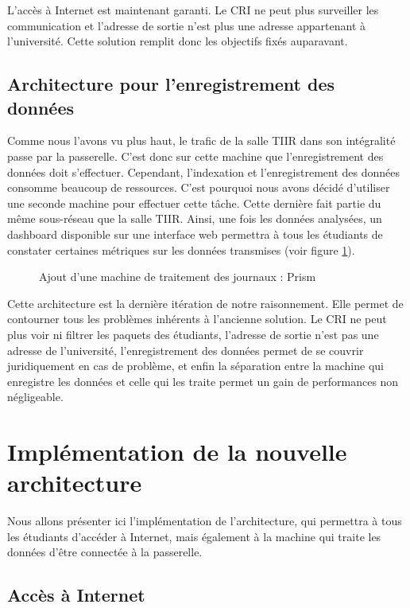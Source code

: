 L'accès à Internet est maintenant garanti. Le CRI ne peut plus surveiller les communication et l'adresse de sortie n'est plus une adresse appartenant à l'université. Cette solution remplit donc les objectifs fixés auparavant.


\subsection{Architecture pour l'enregistrement des données}

Comme nous l'avons vu plus haut, le trafic de la salle TIIR dans son intégralité passe par la passerelle. C'est donc sur cette machine que l'enregistrement des données doit s'effectuer. Cependant, l'indexation et l'enregistrement des données consomme beaucoup de ressources. C'est pourquoi nous avons décidé d'utiliser une seconde machine pour effectuer cette tâche. Cette dernière fait partie du même sous-réseau que la salle TIIR. Ainsi, une fois les données analysées, un dashboard disponible sur une interface web permettra à tous les étudiants de constater certaines métriques sur les données transmises (voir figure \ref{etape3}).

\begin{figure}[!h]
\centering
\def\svgwidth{\columnwidth}

\caption{Ajout d'une machine de traitement des journaux : Prism}
\label{etape3}
\end{figure}

Cette architecture est la dernière itération de notre raisonnement. Elle permet de contourner tous les problèmes inhérents à l'ancienne solution. Le CRI ne peut plus voir ni filtrer les paquets des étudiants, l'adresse de sortie n'est pas une adresse de l'université, l'enregistrement des données permet de se couvrir juridiquement en cas de problème, et enfin la séparation entre la machine qui enregistre les données et celle qui les traite permet un gain de performances non négligeable.


\section{Implémentation de la nouvelle architecture}

Nous allons présenter ici l'implémentation de l'architecture, qui permettra à tous les étudiants d'accéder à Internet, mais également à la machine qui traite les données d'être connectée à la passerelle.

\subsection{Accès à Internet}

